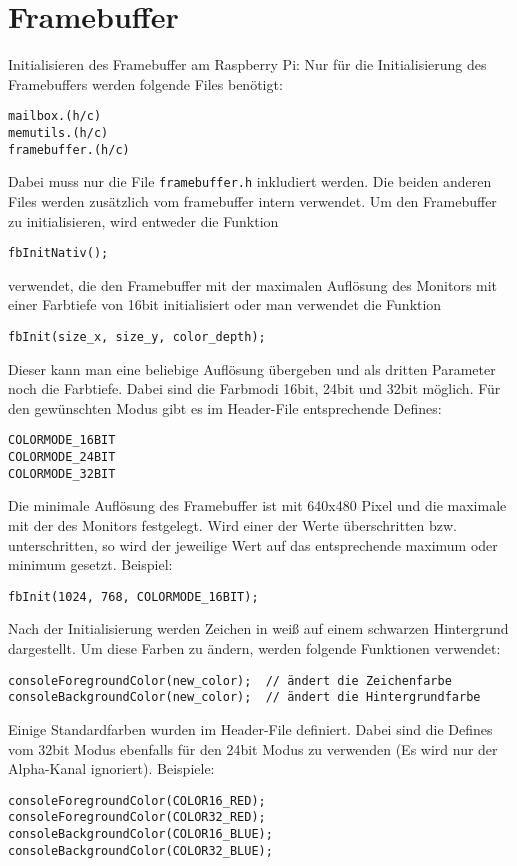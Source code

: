 \documentclass[a4paper,10pt]{scrartcl}
\begin{document}
\newpage
\section*{Framebuffer}
Initialisieren des Framebuffer am Raspberry Pi:
Nur für die Initialisierung des Framebuffers werden folgende Files benötigt:
\begin{verbatim} 
mailbox.(h/c)
memutils.(h/c)
framebuffer.(h/c)
\end{verbatim}
Dabei muss nur die File \texttt{framebuffer.h} inkludiert werden. Die beiden 
anderen Files werden zusätzlich vom framebuffer intern verwendet. Um den
Framebuffer zu initialisieren, wird entweder die Funktion
\begin{verbatim} 
fbInitNativ();
\end{verbatim}
verwendet, die den Framebuffer mit der maximalen Auflösung des
Monitors mit einer
Farbtiefe von 16bit initialisiert oder man verwendet die Funktion
\begin{verbatim} 
fbInit(size_x, size_y, color_depth);
\end{verbatim}
Dieser kann man eine beliebige Auflösung übergeben und als dritten Parameter
noch die Farbtiefe.
Dabei sind die Farbmodi 16bit, 24bit und 32bit möglich.
Für den gewünschten Modus gibt es im Header-File entsprechende Defines:
\begin{verbatim} 
COLORMODE_16BIT
COLORMODE_24BIT
COLORMODE_32BIT
\end{verbatim}
Die minimale Auflösung des Framebuffer ist mit 640x480 Pixel und die maximale
mit der des Monitors
festgelegt. Wird einer der Werte überschritten bzw. unterschritten, so wird der
jeweilige Wert auf
das entsprechende maximum oder minimum gesetzt.
Beispiel:
\begin{verbatim} 
fbInit(1024, 768, COLORMODE_16BIT);
\end{verbatim}
Nach der Initialisierung werden Zeichen in weiß auf einem schwarzen Hintergrund
dargestellt. Um
diese Farben zu ändern, werden folgende Funktionen verwendet:
\begin{verbatim} 
consoleForegroundColor(new_color);  // ändert die Zeichenfarbe
consoleBackgroundColor(new_color);  // ändert die Hintergrundfarbe
\end{verbatim}
Einige Standardfarben wurden im Header-File definiert. Dabei sind die Defines
vom 32bit Modus
ebenfalls für den 24bit Modus zu verwenden (Es wird nur der Alpha-Kanal
ignoriert).
Beispiele:
\begin{verbatim} 
consoleForegroundColor(COLOR16_RED);
consoleForegroundColor(COLOR32_RED);
consoleBackgroundColor(COLOR16_BLUE);
consoleBackgroundColor(COLOR32_BLUE);
\end{verbatim}
\end{document}
